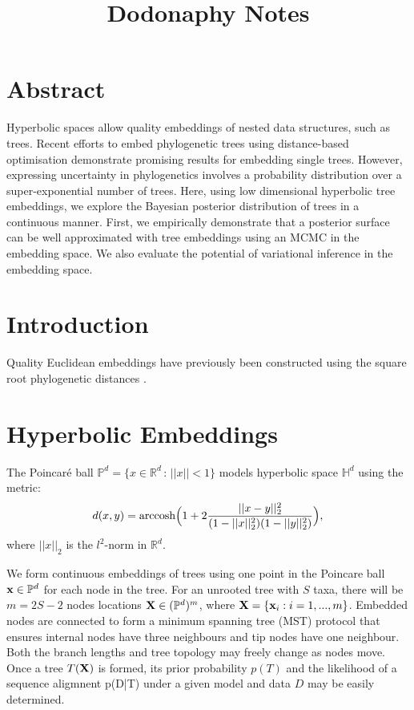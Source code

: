 \documentclass[11pt]{article}
\title{Dodonaphy Notes}
\begin{document}
\maketitle
\section{Abstract}
Hyperbolic spaces allow quality embeddings of nested data structures, such as trees.
Recent efforts to embed phylogenetic trees using distance-based optimisation demonstrate promising results for embedding single trees.
However, expressing uncertainty in phylogenetics involves a probability distribution over a super-exponential number of trees.
Here, using low dimensional hyperbolic tree embeddings, we explore the Bayesian posterior distribution of trees in a continuous manner.
First, we empirically demonstrate that a posterior surface can be well approximated with tree embeddings using an MCMC in the embedding space.
We also evaluate the potential of variational inference in the embedding space.

\section{Introduction}

Quality Euclidean embeddings have previously been constructed using the square root phylogenetic distances \cite{devienne2011euclidean}.


\section{Hyperbolic Embeddings}
The Poincaré ball $\mathbb{P}^{d} = \{x\in \mathbb{R}^{d} \,:\, ||x||<1\}$ models hyperbolic space $\mathbb{H}^{d}$ using the metric:
\begin{equation*}\label{eq:poin_dist}
d(x,y) = \textnormal{arccosh}\Big(1 + 2 \frac{||x-y||_{2}^{2}}{ (1-||x||_{2}^{2}) (1-||y||_{2}^{2})}\Big),
\end{equation*}
where $||x||_{2}$ is the $l^{2}$-norm in $\mathbb{R}^{d}$.

We form continuous embeddings of trees using one point in the Poincare ball $\bold{x} \in \mathbb{P}^{d}$ for each node in the tree.
For an unrooted tree with $S$ taxa, there will be $m=2S - 2$ nodes locations $\bold{X} \in(\mathbb{P}^{d})^{m}$, where $\bold{X} = \{\bold{x}_{i}: i=1, ..., m\}$.
Embedded nodes are connected to form a minimum spanning tree (MST) protocol that ensures internal nodes have three neighbours and tip nodes have one neighbour.
Both the branch lengths and tree topology may freely change as nodes move.
Once a tree $T(\bold{X})$ is formed, its prior probability $p(T)$ and the likelihood of a sequence aligmnent p(D\big|T) under a given model and data $D$ may be easily determined.
\end{document}
